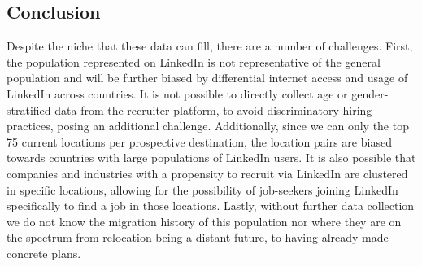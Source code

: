 \subsection*{Conclusion}
Despite the niche that these data can fill, there are a number of challenges. First, the population represented on LinkedIn is not representative of the general population and will be further biased by differential internet access and usage of LinkedIn across countries. It is not possible to directly collect age or gender-stratified data from the recruiter platform, to avoid discriminatory hiring practices, posing an additional challenge. Additionally, since we can only the top 75 current locations per prospective destination, the location pairs are biased towards countries with large populations of LinkedIn users. It is also possible that companies and industries with a propensity to recruit via LinkedIn are clustered in specific locations, allowing for the possibility of job-seekers joining LinkedIn specifically to find a job in those locations. Lastly, without further data collection we do not know the migration history of this population nor where they are on the spectrum from relocation being a distant future, to having already made concrete plans.

